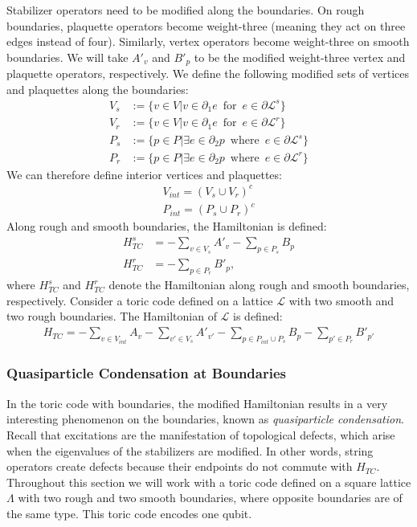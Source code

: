 \documentclass[12pt]{article}
\theoremstyle{definition}
\begin{document}
Stabilizer operators need to be modified along the boundaries. On rough boundaries, plaquette operators become weight-three (meaning they act on three edges instead of four). Similarly, vertex operators become weight-three on smooth boundaries. We will take $A'_v$ and $B'_p$ to be the modified weight-three vertex and plaquette operators, respectively. We define the following modified sets of vertices and plaquettes along the boundaries:
    \begin{align}
        V_s &:= \{v\in V|v\in\partial_1e\enspace\text{for}\enspace e\in\partial\mathcal{L}^s\}\\
        V_r &:= \{v\in V|v\in\partial_1e\enspace\text{for}\enspace e\in\partial\mathcal{L}^r\}\\
        P_s &:= \{p\in P|\exists e\in\partial_2p\enspace\text{where}\enspace e\in\partial\mathcal{L}^s\}\\
        P_r &:= \{p\in P|\exists e\in\partial_2p\enspace\text{where}\enspace e\in\partial\mathcal{L}^r\}
    \end{align}
We can therefore define interior vertices and plaquettes:
    \begin{align}
        V_{int} = (V_s\cup V_r)^c\\
        P_{int} = (P_s\cup P_r)^c
    \end{align}
Along rough and smooth boundaries, the Hamiltonian is defined:
    \begin{align}
        H^{s}_{TC} &= -\sum_{v\in V_s}A'_v-\sum_{p\in P_s}B_p\\
        H^{r}_{TC} &= -\sum_{p\in P_r}B'_p,
    \end{align}
where $H^s_{TC}$ and $H^r_{TC}$ denote the Hamiltonian along rough and smooth boundaries, respectively. Consider a toric code defined on a lattice $\mathcal{L}$ with two smooth and two rough boundaries. The Hamiltonian of $\mathcal{L}$ is defined:
    \begin{align}
        H_{TC} = -\sum_{v\in V_{int}}A_v-\sum_{v'\in V_s}A'_{v'}-\sum_{p\in P_{int}\cup P_s}B_p-\sum_{p'\in P_r}B'_{p'}
    \end{align}

\newpage
\subsubsection{Quasiparticle Condensation at Boundaries}
In the toric code with boundaries, the modified Hamiltonian results in a very interesting phenomenon on the boundaries, known as \emph{quasiparticle condensation}\cite{burnell2017}. Recall that excitations are the manifestation of topological defects, which arise when the eigenvalues of the stabilizers are modified. In other words, string operators create defects because their endpoints do not commute with $H_{TC}$. Throughout this section we will work with a toric code defined on a square lattice $\Lambda$ with two rough and two smooth boundaries, where opposite boundaries are of the same type. This toric code encodes one qubit.
\newline
\end{document}
